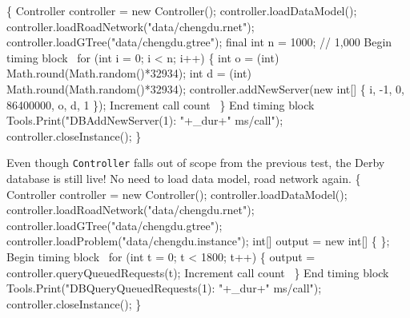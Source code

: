 \documentclass{article}
\def\nwendcode{\endtrivlist \endgroup}
\let\nwdocspar=\par
\begin{document}
\nwenddocs{}\endmoddef{}
\{
  Controller controller = new Controller();
  controller.loadDataModel();
  controller.loadRoadNetwork("data/chengdu.rnet");
  controller.loadGTree("data/chengdu.gtree");
  final int n = 1000;  // 1,000
  \LA{}Begin timing block~{\nwtagstyle{}}\RA{}
  for (int i = 0; i < n; i++) \{
    int o = (int) Math.round(Math.random()*32934);
    int d = (int) Math.round(Math.random()*32934);
    controller.addNewServer(new int[] \{ i, -1, 0, 86400000, o, d, 1 \});
    \LA{}Increment call count~{\nwtagstyle{}}\RA{}
  \}
  \LA{}End timing block~{\nwtagstyle{}}\RA{}
  Tools.Print("DBAddNewServer(1): "+_dur+" ms/call");
  controller.closeInstance();
\}
\nwendcode{}\nwdocspar

Even though {\tt{}Controller} falls out of scope from the previous test,
the Derby database is still live! No need to load data model, road network
again.
\nwenddocs{}\endmoddef{}
\{
  Controller controller = new Controller();
  controller.loadDataModel();
  controller.loadRoadNetwork("data/chengdu.rnet");
  controller.loadGTree("data/chengdu.gtree");
  controller.loadProblem("data/chengdu.instance");
  int[] output = new int[] \{ \};
  \LA{}Begin timing block~{\nwtagstyle{}}\RA{}
  for (int t = 0; t < 1800; t++) \{
    output = controller.queryQueuedRequests(t);
    \LA{}Increment call count~{\nwtagstyle{}}\RA{}
  \}
  \LA{}End timing block~{\nwtagstyle{}}\RA{}
  Tools.Print("DBQueryQueuedRequests(1): "+_dur+" ms/call");
  controller.closeInstance();
\}
\nwendcode{}\nwdocspar
\end{document}
